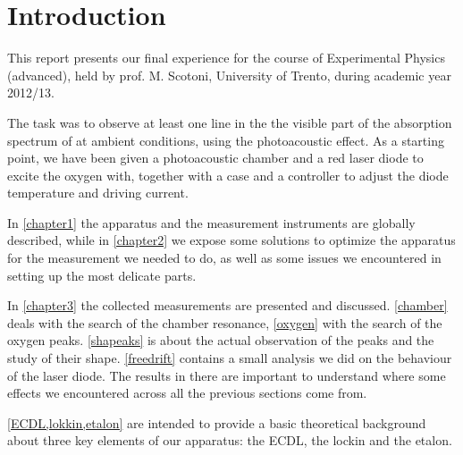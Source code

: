 \chapter*{Introduction}

This report presents our final experience for the course of Experimental Physics (advanced), held by prof. M. Scotoni, University of Trento, during academic year 2012/13.

\bigskip
The task was to observe at least one line in the the visible part of the absorption spectrum of  at ambient conditions, using the photoacoustic effect. As a starting point, we have been given a photoacoustic chamber and a red laser diode to excite the oxygen with, together with a case and a controller to adjust the diode temperature and driving current.

\bigskip
In \cref{chapter1} the apparatus and the measurement instruments are globally described, while in \cref{chapter2} we expose some solutions to optimize the apparatus for the measurement we needed to do, as well as some issues we encountered in setting up the most delicate parts.

\medskip
In \cref{chapter3} the collected measurements are presented and discussed. \cref{chamber} deals with the search of the chamber resonance, \cref{oxygen} with the search of the oxygen peaks. \cref{shapeaks} is about the actual observation of the peaks and the study of their shape. \cref{freedrift} contains a small analysis we did on the behaviour of the laser diode. The results in there are important to understand where some effects we encountered across all the previous sections come from.

\medskip
\cref{ECDL,lokkin,etalon} are intended to provide a basic theoretical background about three key elements of our apparatus: the ECDL, the lockin and the etalon.